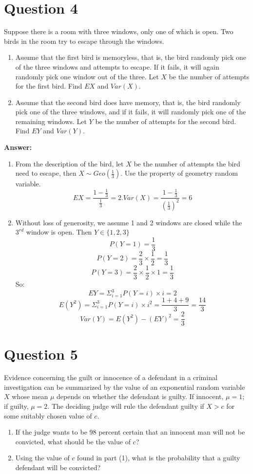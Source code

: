 \documentclass[hidelinks]{article}
\begin{document}
\section{Question 4}
Suppose there is a room with three windows, only one of which is open. Two birds in the room try to escape through the windows.
\begin{enumerate}
    \item Assume that the first bird is memoryless, that is, the bird randomly pick one of the three windows and attempts to escape. If it fails, it will again randomly pick one window out of the three. Let $X$ be the number of attempts for the first bird. Find $EX$ and $Var(X)$.
    \item Assume that the second bird does have memory, that is, the bird randomly pick one of the three windows, and if it fails, it will randomly pick one of the remaining windows. Let $Y$ be the number of attempts for the second bird. Find $EY$ and $Var(Y)$.
\end{enumerate}
\textbf{Answer:}
\begin{enumerate}
    \item From the description of the bird, let $X$ be the number of attempts the bird need to escape, then $X \sim Geo(\frac{1}{3})$. Use the property of geometry random variable.
    $$EX = \frac{1 - \frac{1}{3}}{\frac{1}{3}} = 2. Var(X) = \frac{1 - \frac{1}{3}}{(\frac{1}{3})^2} = 6$$
    \item Without loss of generosity, we assume 1 and 2 windows are closed while the $3^{rd}$ window is open. Then $Y \in \{1,2,3\}$
    $$P(Y = 1) = \frac{1}{3}$$
    $$P(Y = 2) = \frac{2}{3} \times \frac{1}{2} = \frac{1}{3}$$
    $$P(Y = 3) = \frac{2}{3} \times \frac{1}{2} \times 1 = \frac{1}{3}$$
    So:
    $$ EY = \Sigma^3_{i=1}P(Y=i)\times i = 2$$
    $$ E(Y^2) = \Sigma^3_{i=1}P(Y=i)\times i^2 = \frac{1 + 4 + 9}{3} =\frac{14}{3}$$
    $$ Var(Y) = E(Y^2) - (EY)^2 = \frac{2}{3}$$
\end{enumerate}



\section{Question 5}
Evidence concerning the guilt or innocence of a defendant in a criminal investigation can be summarized by the value of an exponential random variable $X$ whose mean $\mu$ depends on whether the defendant is guilty. If innocent, $\mu = 1$; if guilty, $\mu = 2$. The deciding judge will rule the defendant guilty if $X>c$ for some suitably chosen value of $c$.
\begin{enumerate}
    \item  If the judge wants to be 98 percent certain that an innocent man will not be convicted, what should be the value of $c$?
    \item  Using the value of $c$ found in part (1), what is the probability that a guilty defendant will be convicted?
\end{enumerate}
\end{document}
